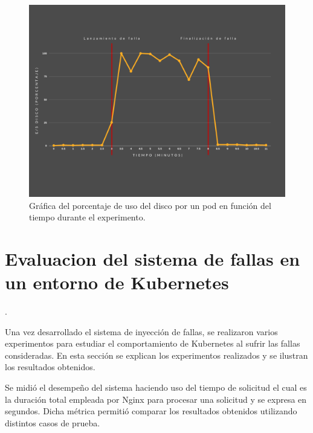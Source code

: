  

\begin{figure}[htpb!]
	\centering
	\includegraphics[width=0.95\columnwidth]{images/graficaspruebas/usodisco.png}
	\caption{Gráfica del porcentaje de uso del disco por un pod en función del tiempo durante el experimento.}
	\label{fig:usodico01}
\end{figure}

\section{Evaluacion del sistema de fallas en un entorno de Kubernetes}

.


\par Una vez desarrollado el sistema de inyección de fallas, se realizaron varios experimentos para estudiar el comportamiento de Kubernetes al sufrir las fallas consideradas. En esta sección se explican los experimentos realizados y se ilustran los resultados obtenidos.\\

\label{sec:medicion}
\par Se midió el desempeño del sistema haciendo uso del tiempo de solicitud el cual es la duración total empleada por Nginx para procesar una solicitud y se expresa en segundos. Dicha métrica permitió comparar los resultados obtenidos utilizando distintos casos de prueba.\\


